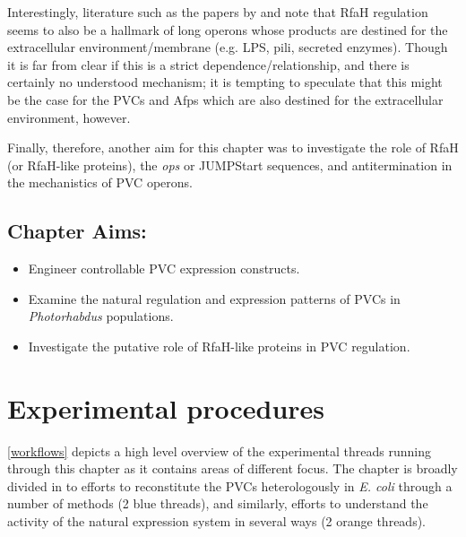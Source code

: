 Interestingly, literature such as the papers by \cite{Bailey1996} and \cite{Santangelo2002} note that RfaH regulation seems to also be a hallmark of long operons whose products are destined for the extracellular environment/membrane (e.g. LPS, pili, secreted enzymes). Though it is far from clear if this is a strict dependence/relationship, and there is certainly no understood mechanism; it is tempting to speculate that this might be the case for the PVCs and Afps which are also destined for the extracellular environment, however. 

Finally, therefore, another aim for this chapter was to investigate the role of RfaH (or RfaH-like proteins), the \emph{ops} or JUMPStart sequences, and antitermination in the mechanistics of PVC operons.

\subsection*{Chapter Aims:}
\begin{itemize}
	\item Engineer controllable PVC expression constructs.
	\item Examine the natural regulation and expression patterns of PVCs in \emph{Photorhabdus} populations.
	\item Investigate the putative role of RfaH-like proteins in PVC regulation.
\end{itemize}
\clearpage


\section{Experimental procedures}

\vref{workflows} depicts a high level overview of the experimental threads running through this chapter as it contains areas of different focus. The chapter is broadly divided in to efforts to reconstitute the PVCs heterologously in \emph{E. coli} through a number of methods (2 blue threads), and similarly, efforts to understand the activity of the natural expression system in several ways (2 orange threads).

